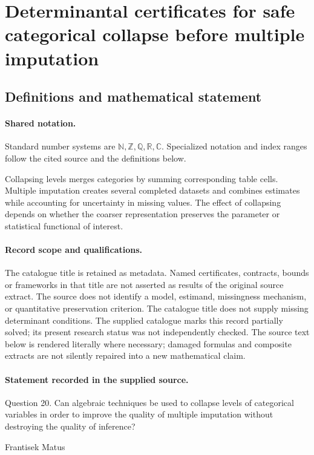 \documentclass[11pt]{article}
\begin{document}
\section{Determinantal certificates for safe categorical collapse before multiple imputation}\label{statement}

\subsection{Definitions and mathematical statement}

\paragraph{Shared notation.}Standard number systems are $\mathbb N,\mathbb Z,\mathbb Q,\mathbb R,\mathbb C$. Specialized notation and index ranges follow the cited source and the definitions below.


Collapsing levels merges categories by summing corresponding table cells. Multiple imputation creates several completed datasets and combines estimates while accounting for uncertainty in missing values. The effect of collapsing depends on whether the coarser representation preserves the parameter or statistical functional of interest.
\paragraph{Record scope and qualifications.}
The catalogue title is retained as metadata. Named certificates, contracts, bounds or frameworks in that title are not asserted as results of the original source extract.
The source does not identify a model, estimand, missingness mechanism, or quantitative preservation criterion. The catalogue title does not supply missing determinant conditions. The supplied catalogue marks this record partially solved; its present research status was not independently checked.
The source text below is rendered literally where necessary; damaged formulas and composite extracts are not silently repaired into a new mathematical claim.
\paragraph{Statement recorded in the supplied source.}
Question 20. Can algebraic techniques be used to collapse levels of categorical variables in order to improve the quality of multiple imputation without destroying the quality of inference?

Frantisek Matus
\end{document}
